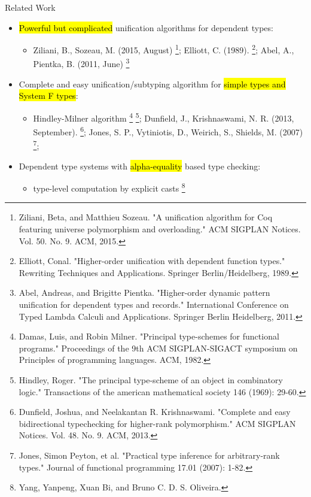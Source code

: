 \documentclass{beamer}
\begin{document}
\begin{frame}{Related Work}
  \begin{itemize}
\item \hl{Powerful but complicated} unification algorithms for dependent types:
  \begin{itemize}
  \item Ziliani, B., Sozeau, M. (2015, August)
  \footnote{Ziliani, Beta, and Matthieu Sozeau. "A unification algorithm for Coq
    featuring universe polymorphism and overloading." ACM SIGPLAN Notices. Vol.
    50. No. 9. ACM, 2015.};
  Elliott, C. (1989).
  \footnote{Elliott, Conal. "Higher-order unification with dependent function
    types." Rewriting Techniques and Applications. Springer Berlin/Heidelberg,
    1989.};
  Abel, A., Pientka, B. (2011, June)
  \footnote{Abel, Andreas, and Brigitte Pientka. "Higher-order dynamic pattern
    unification for dependent types and records." International Conference on
    Typed Lambda Calculi and Applications. Springer Berlin Heidelberg, 2011.}
  \end{itemize}
\item Complete and easy unification/subtyping algorithm for \hl{simple types and
  System F types}:
  \begin{itemize}
  \item Hindley-Milner algorithm
    \footnote{Damas, Luis, and Robin Milner. "Principal type-schemes for
      functional programs." Proceedings of the 9th ACM SIGPLAN-SIGACT symposium
      on Principles of programming languages. ACM, 1982.}
    \footnote{Hindley, Roger. "The principal type-scheme of an object in
      combinatory logic." Transactions of the american mathematical society 146
      (1969): 29-60.};
  Dunfield, J., Krishnaswami, N. R. (2013, September).
    \footnote{Dunfield, Joshua, and Neelakantan R. Krishnaswami. "Complete and
      easy bidirectional typechecking for higher-rank polymorphism." ACM SIGPLAN
      Notices. Vol. 48. No. 9. ACM, 2013.};
  Jones, S. P., Vytiniotis, D., Weirich, S., Shields, M. (2007)
    \footnote{Jones, Simon Peyton, et al. "Practical type inference for
      arbitrary-rank types." Journal of functional programming 17.01 (2007):
      1-82.};
  \end{itemize}
\item Dependent type systems with \hl{alpha-equality} based type checking:
  \begin{itemize}
  \item type-level computation by explicit casts
            \footnote{Yang, Yanpeng, Xuan Bi, and Bruno C. D. S. Oliveira.
}
\end{itemize}
\end{itemize}
\end{frame}
\end{document}
